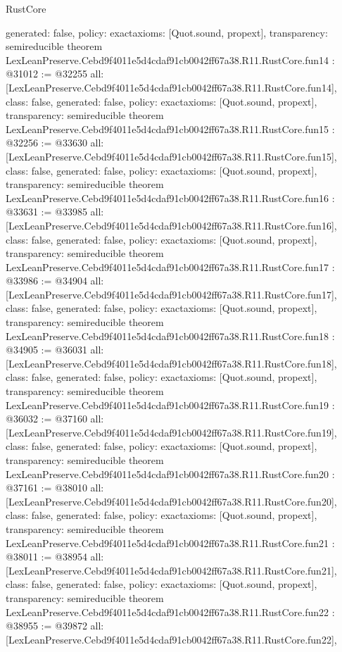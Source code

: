\begin{lexlean}{RustCore}
\begin{coremodule}
{  generated: false,
  policy: exact{axioms: [Quot.sound, propext]},
  transparency: semireducible
}
theorem LexLeanPreserve.Cebd9f4011e5d4cdaf91cb0042ff67a38.R11.RustCore.fun14 : @31012 := @32255 {
  all: [LexLeanPreserve.Cebd9f4011e5d4cdaf91cb0042ff67a38.R11.RustCore.fun14],
  class: false,
  generated: false,
  policy: exact{axioms: [Quot.sound, propext]},
  transparency: semireducible
}
theorem LexLeanPreserve.Cebd9f4011e5d4cdaf91cb0042ff67a38.R11.RustCore.fun15 : @32256 := @33630 {
  all: [LexLeanPreserve.Cebd9f4011e5d4cdaf91cb0042ff67a38.R11.RustCore.fun15],
  class: false,
  generated: false,
  policy: exact{axioms: [Quot.sound, propext]},
  transparency: semireducible
}
theorem LexLeanPreserve.Cebd9f4011e5d4cdaf91cb0042ff67a38.R11.RustCore.fun16 : @33631 := @33985 {
  all: [LexLeanPreserve.Cebd9f4011e5d4cdaf91cb0042ff67a38.R11.RustCore.fun16],
  class: false,
  generated: false,
  policy: exact{axioms: [Quot.sound, propext]},
  transparency: semireducible
}
theorem LexLeanPreserve.Cebd9f4011e5d4cdaf91cb0042ff67a38.R11.RustCore.fun17 : @33986 := @34904 {
  all: [LexLeanPreserve.Cebd9f4011e5d4cdaf91cb0042ff67a38.R11.RustCore.fun17],
  class: false,
  generated: false,
  policy: exact{axioms: [Quot.sound, propext]},
  transparency: semireducible
}
theorem LexLeanPreserve.Cebd9f4011e5d4cdaf91cb0042ff67a38.R11.RustCore.fun18 : @34905 := @36031 {
  all: [LexLeanPreserve.Cebd9f4011e5d4cdaf91cb0042ff67a38.R11.RustCore.fun18],
  class: false,
  generated: false,
  policy: exact{axioms: [Quot.sound, propext]},
  transparency: semireducible
}
theorem LexLeanPreserve.Cebd9f4011e5d4cdaf91cb0042ff67a38.R11.RustCore.fun19 : @36032 := @37160 {
  all: [LexLeanPreserve.Cebd9f4011e5d4cdaf91cb0042ff67a38.R11.RustCore.fun19],
  class: false,
  generated: false,
  policy: exact{axioms: [Quot.sound, propext]},
  transparency: semireducible
}
theorem LexLeanPreserve.Cebd9f4011e5d4cdaf91cb0042ff67a38.R11.RustCore.fun20 : @37161 := @38010 {
  all: [LexLeanPreserve.Cebd9f4011e5d4cdaf91cb0042ff67a38.R11.RustCore.fun20],
  class: false,
  generated: false,
  policy: exact{axioms: [Quot.sound, propext]},
  transparency: semireducible
}
theorem LexLeanPreserve.Cebd9f4011e5d4cdaf91cb0042ff67a38.R11.RustCore.fun21 : @38011 := @38954 {
  all: [LexLeanPreserve.Cebd9f4011e5d4cdaf91cb0042ff67a38.R11.RustCore.fun21],
  class: false,
  generated: false,
  policy: exact{axioms: [Quot.sound, propext]},
  transparency: semireducible
}
theorem LexLeanPreserve.Cebd9f4011e5d4cdaf91cb0042ff67a38.R11.RustCore.fun22 : @38955 := @39872 {
  all: [LexLeanPreserve.Cebd9f4011e5d4cdaf91cb0042ff67a38.R11.RustCore.fun22],
}
\end{coremodule}
\end{lexlean}
